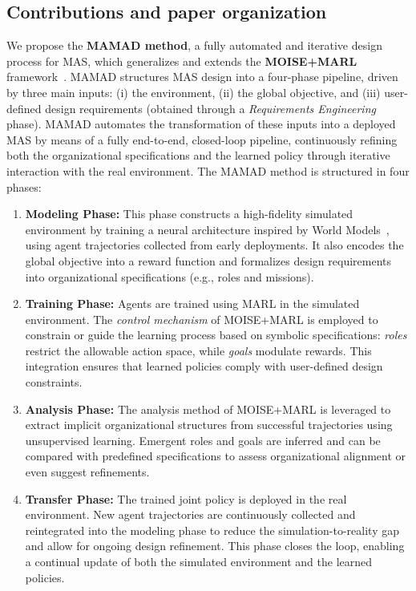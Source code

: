 \documentclass[pdflatex,sn-mathphys-num]{sn-jnl}%
\theoremstyle{thmstyleone}%
\theoremstyle{thmstyletwo}%
\theoremstyle{thmstylethree}%
\begin{document}
\subsection{Contributions and paper organization}

We propose the \textbf{MAMAD method}, a fully automated and iterative design process for MAS, which generalizes and extends the \textbf{MOISE+MARL} framework~\cite{soule2025moisemarl}. MAMAD structures MAS design into a four-phase pipeline, driven by three main inputs: (i) the environment, (ii) the global objective, and (iii) user-defined design requirements (obtained through a \textit{Requirements Engineering} phase). MAMAD automates the transformation of these inputs into a deployed MAS by means of a fully end-to-end, closed-loop pipeline, continuously refining both the organizational specifications and the learned policy through iterative interaction with the real environment.
The MAMAD method is structured in four phases:

\begin{enumerate}
    \item \textbf{Modeling Phase:} This phase constructs a high-fidelity simulated environment by training a neural architecture inspired by World Models~\cite{Ha2018}, using agent trajectories collected from early deployments. It also encodes the global objective into a reward function and formalizes design requirements into organizational specifications (e.g., roles and missions).

    \item \textbf{Training Phase:} Agents are trained using MARL in the simulated environment. The \textit{control mechanism} of MOISE+MARL is employed to constrain or guide the learning process based on symbolic specifications: \textit{roles} restrict the allowable action space, while \textit{goals} modulate rewards. This integration ensures that learned policies comply with user-defined design constraints.

    \item \textbf{Analysis Phase:} The analysis method of MOISE+MARL is leveraged to extract implicit organizational structures from successful trajectories using unsupervised learning. Emergent roles and goals are inferred and can be compared with predefined specifications to assess organizational alignment or even suggest refinements.

    \item \textbf{Transfer Phase:} The trained joint policy is deployed in the real environment. New agent trajectories are continuously collected and reintegrated into the modeling phase to reduce the simulation-to-reality gap and allow for ongoing design refinement. This phase closes the loop, enabling a continual update of both the simulated environment and the learned policies.
\end{enumerate}
\end{document}
